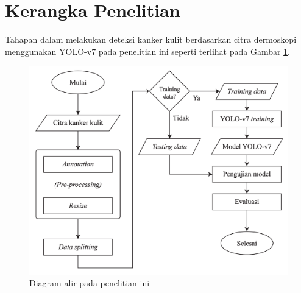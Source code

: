 \section{Kerangka Penelitian}
Tahapan dalam melakukan deteksi kanker kulit berdasarkan citra dermoskopi menggunakan YOLO-v7 pada penelitian ini seperti terlihat pada Gambar \ref{fig:flowchart}.

\begin{figure}[H]
    \begin{center}
        \includegraphics[width=13cm]{img/bab3/flowchart.png}
        \caption{Diagram alir pada penelitian ini}
        \label{fig:flowchart}
    \end{center}
\end{figure}

